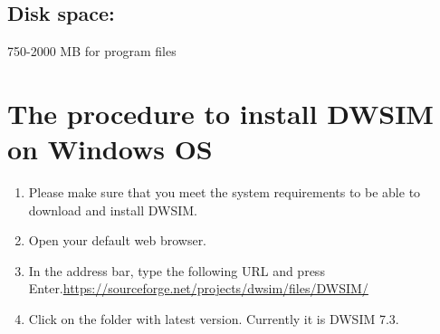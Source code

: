 \documentclass[12pt,a4paper]{article}
\begin{document}
\subsection*{Disk space:}	

750-2000 MB for program files

\section{The procedure to install DWSIM on Windows OS}

\begin{enumerate}
\item Please make sure that you meet the system requirements to be able to download and install DWSIM.
\item Open your default web browser.
\item In the address bar, type the following URL and press Enter.\newline \url{https://sourceforge.net/projects/dwsim/files/DWSIM/}

\item Click on the folder with latest version. Currently it is DWSIM 7.3.


\end{enumerate}
\end{document}
